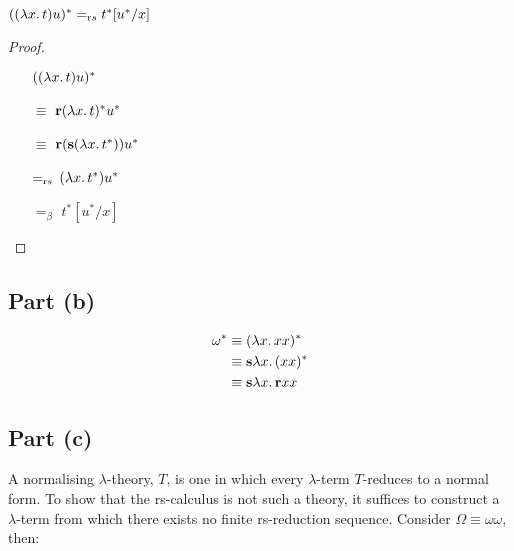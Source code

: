 \begin{prop}
  $((\lambda x\ldotp t)u)^* =_{\text rs} t^*[u^*/x]$
  \begin{proof}
    \begin{itemize}
      \item[\phantom{$\equiv$}]
        $((\lambda x\ldotp t)u)^*$

      \item[$\equiv$]
        $\mathbf{r}(\lambda x\ldotp t)^*u^*$
        \marginnote{\Def-$(-)^*$}

      \item[$\equiv$]
        $\mathbf{r}(\mathbf{s}(\lambda x\ldotp t^*))u^*$
        \marginnote{\Def-$(-)^*$}

      \item[$=_{\text rs}$]$(\lambda x\ldotp t^*)u^*$

      \item[$=_\beta$] $t^*[u^*/x]$
        \marginnote{\Def-$=_\beta$}
        \qedhere
    \end{itemize}
  \end{proof}
\end{prop}

\subsection{Part (b)}\label{sec:q-2-b}

\begin{align*}
  \omega^* & \equiv (\lambda x\ldotp xx)^*\\
  & \equiv \mathbf{s}\lambda x\ldotp (xx)^*\\
  & \equiv \mathbf{s}\lambda x\ldotp \mathbf{r}xx
\end{align*}

\subsection{Part (c)}\label{sec:q-2-c}

A normalising $\lambda$-theory, $T$, is one in which every $\lambda$-term $T$-reduces to a normal form. To show that the rs-calculus is not such a theory, it suffices to construct a $\lambda$-term from which there exists no finite rs-reduction sequence. Consider $\Omega\equiv\omega\omega$, then:

